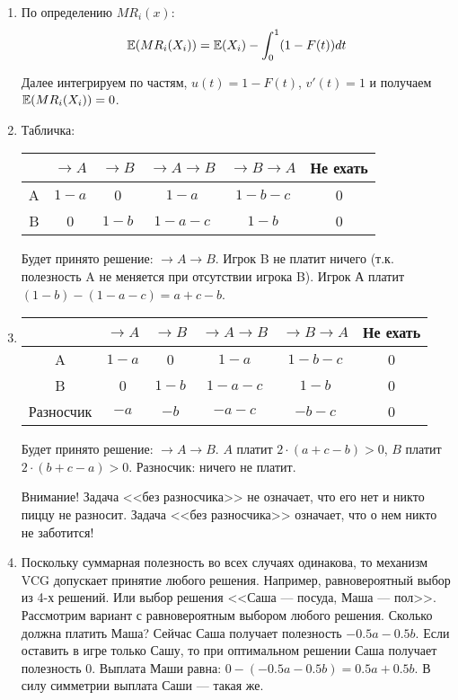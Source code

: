 \begin{enumerate}
\item По определению $ MR_{i}(x) $:
\begin{equation}
\mathbb{E}(MR_{i}(X_{i}))=\mathbb{E}(X_{i})-\int_{0}^{1}(1-F(t))dt
\end{equation}

Далее интегрируем по частям, $ u(t)=1-F(t) $, $ v'(t)=1 $ и получаем $ \mathbb{E}(MR_{i}(X_{i}))=0 $.

\item Табличка:

\begin{tabular}{c|ccccc}
& $ \to A $ & $ \to B $ & $ \to A\to B $ & $ \to B \to A $ & Не ехать \\ 
\hline 
A & $ 1-a $ & 0 & $ 1-a $ & $ 1-b-c $ & 0 \\ 
B & 0 & $ 1-b $ & $ 1-a-c $ & $ 1-b $ & 0 \\ 
\end{tabular} 

Будет принято решение: $ \to A\to B $. Игрок B не платит ничего (т.к. полезность A не меняется при отсутствии игрока B). Игрок А платит $ (1-b)-(1-a-c)=a+c-b $.

\item \begin{tabular}{c|ccccc}
& $ \to A $ & $ \to B $ & $ \to A\to B $ & $ \to B \to A $ & Не ехать \\ 
\hline 
A & $ 1-a $ & 0 & $ 1-a $ & $ 1-b-c $ & 0 \\ 
B & 0 & $ 1-b $ & $ 1-a-c $ & $ 1-b $ & 0 \\ 
Разносчик & $ -a $ & $ -b $ & $ -a-c $ & $ -b-c $ & 0 \\
\end{tabular} 

Будет принято решение: $ \to A\to B $. $ A $ платит $ 2\cdot (a+c-b)>0 $, $ B $ платит $ 2\cdot (b+c-a)>0 $. Разносчик: ничего не платит.

Внимание! Задача <<без разносчика>> не означает, что его нет и никто пиццу не разносит. Задача <<без разносчика>> означает, что о нем никто не заботится!

\item Поскольку суммарная полезность во всех случаях одинакова, то механизм VCG допускает принятие любого решения. Например, равновероятный выбор из 4-х решений. Или выбор решения <<Саша --- посуда, Маша --- пол>>. Рассмотрим вариант с равновероятным выбором любого решения. Сколько должна платить Маша? Сейчас Саша получает полезность $-0.5a-0.5b $. Если оставить в игре только Сашу, то при оптимальном решении Саша получает полезность $ 0 $. Выплата Маши равна: $0-(-0.5a-0.5b)=0.5a+0.5b$. В силу симметрии выплата Саши --- такая же. 


\end{enumerate}
